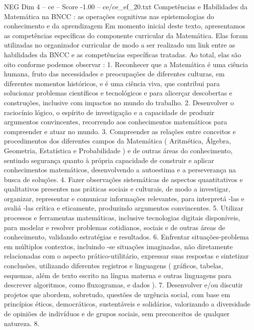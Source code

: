 \begin{textsample}{NEG Dim 4 – ce – Score -1.00 – ce/ce\_ef\_20.txt}  \label{ex:f4_neg_155}
Competências e Habilidades da Matemática na BNCC : as operações cognitivas nas epistemologias do conhecimento e da aprendizagem Em momento inicial deste texto, apresentamos as competências específicas do componente curricular da Matemática.
Elas foram utilizadas no organizador curricular de modo a ser realizado um link entre as habilidades da BNCC e as competências específicas tratadas.
Ao total, elas são oito conforme podemos observar : 1.
Reconhecer que a Matemática é uma ciência humana, fruto das necessidades e preocupações de diferentes culturas, em diferentes momentos históricos, e é uma ciência viva, que contribui para solucionar problemas científicos e tecnológicos e para alicerçar descobertas e construções, inclusive com impactos no mundo do trabalho. 2.
Desenvolver o raciocínio lógico, o espírito de investigação e a capacidade de produzir argumentos convincentes, recorrendo aos conhecimentos matemáticos para compreender e atuar no mundo. 3.
Compreender as relações entre conceitos e procedimentos dos diferentes campos da Matemática ( Aritmética, Álgebra, Geometria, Estatística e Probabilidade ) e de outras áreas do conhecimento, sentindo segurança quanto à própria capacidade de construir e aplicar conhecimentos matemáticos, desenvolvendo a autoestima e a perseverança na busca de soluções. 4.
Fazer observações sistemáticas de aspectos quantitativos e qualitativos presentes nas práticas sociais e culturais, de modo a investigar, organizar, representar e comunicar informações relevantes, para interpretá -las e avaliá -las crítica e eticamente, produzindo argumentos convincentes. 5.
Utilizar processos e ferramentas matemáticas, inclusive tecnologias digitais disponíveis, para modelar e resolver problemas cotidianos, sociais e de outras áreas de conhecimento, validando estratégias e resultados. 6.
Enfrentar situações-problema em múltiplos contextos, incluindo -se situações imaginadas, não diretamente relacionadas com o aspecto prático-utilitário, expressar suas respostas e sintetizar conclusões, utilizando diferentes registros e linguagens ( gráficos, tabelas, esquemas, além de texto escrito na língua materna e outras linguagens para descrever algoritmos, como fluxogramas, e dados ). 7.
Desenvolver e/ou discutir projetos que abordem, sobretudo, questões de urgência social, com base em princípios éticos, democráticos, sustentáveis e solidários, valorizando a diversidade de opiniões de indivíduos e de grupos sociais, sem preconceitos de qualquer natureza. 8.

\end{textsample}
